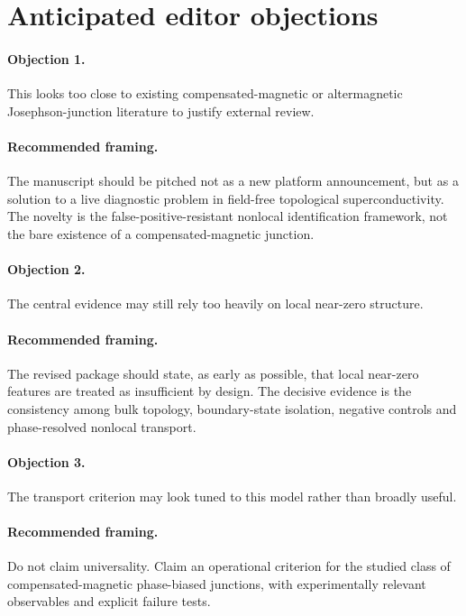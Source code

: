 \section*{Anticipated editor objections}

\paragraph{Objection 1.}
This looks too close to existing compensated-magnetic or altermagnetic Josephson-junction literature to justify external review.

\paragraph{Recommended framing.}
The manuscript should be pitched not as a new platform announcement, but as a solution to a live diagnostic problem in field-free topological superconductivity. The novelty is the false-positive-resistant nonlocal identification framework, not the bare existence of a compensated-magnetic junction.

\paragraph{Objection 2.}
The central evidence may still rely too heavily on local near-zero structure.

\paragraph{Recommended framing.}
The revised package should state, as early as possible, that local near-zero features are treated as insufficient by design. The decisive evidence is the consistency among bulk topology, boundary-state isolation, negative controls and phase-resolved nonlocal transport.

\paragraph{Objection 3.}
The transport criterion may look tuned to this model rather than broadly useful.

\paragraph{Recommended framing.}
Do not claim universality. Claim an operational criterion for the studied class of compensated-magnetic phase-biased junctions, with experimentally relevant observables and explicit failure tests.

